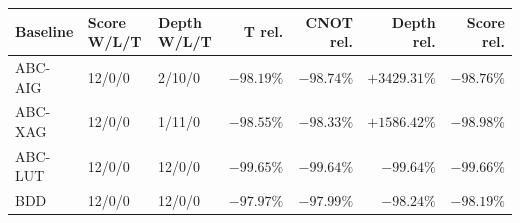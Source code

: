 \begin{tabular}{lllrrrr}
\toprule
Baseline & Score W/L/T & Depth W/L/T & T rel. & CNOT rel. & Depth rel. & Score rel. \\
\midrule
ABC-AIG & 12/0/0 & 2/10/0 & $-98.19\%$ & $-98.74\%$ & $+3429.31\%$ & $-98.76\%$ \\
ABC-XAG & 12/0/0 & 1/11/0 & $-98.55\%$ & $-98.33\%$ & $+1586.42\%$ & $-98.98\%$ \\
ABC-LUT & 12/0/0 & 12/0/0 & $-99.65\%$ & $-99.64\%$ & $-99.64\%$ & $-99.66\%$ \\
BDD & 12/0/0 & 12/0/0 & $-97.97\%$ & $-97.99\%$ & $-98.24\%$ & $-98.19\%$ \\
\bottomrule
\end{tabular}
